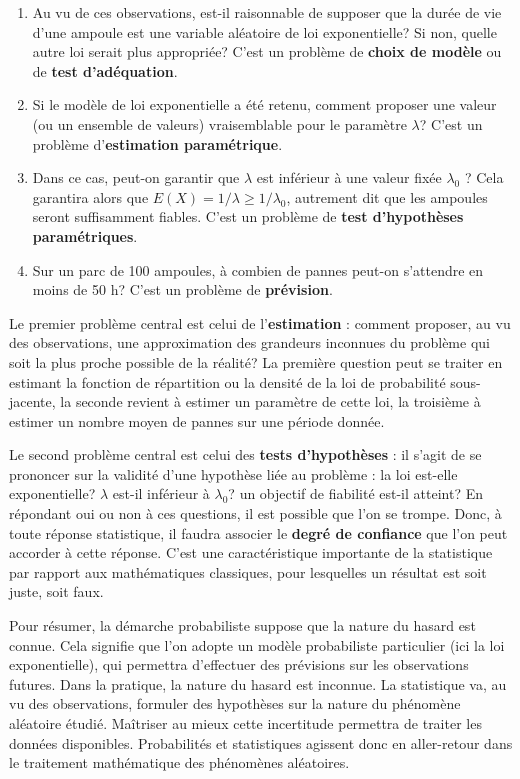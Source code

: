 \documentclass[]{book}
\providecommand{\tightlist}{%
  \setlength{\itemsep}{0pt}\setlength{\parskip}{0pt}}
\theoremstyle{magentacolor}
\theoremstyle{proprie}
\theoremstyle{exstyle}
\theoremstyle{exostyle}
\theoremstyle{definition}
\theoremstyle{definition}
\theoremstyle{definition}
\theoremstyle{remark}
\begin{document}
\begin{enumerate}
\def\labelenumi{\arabic{enumi}.}
\tightlist
\item
  Au vu de ces observations, est-il raisonnable de supposer que la durée de vie d'une
  ampoule est une variable aléatoire de loi exponentielle? Si non, quelle autre loi serait
  plus appropriée? C'est un problème de \textbf{choix de modèle} ou de \textbf{test d'adéquation}.
\item
  Si le modèle de loi exponentielle a été retenu, comment proposer une valeur (ou
  un ensemble de valeurs) vraisemblable pour le paramètre \(\lambda\)? C'est un problème
  d'\textbf{estimation paramétrique}.
\item
  Dans ce cas, peut-on garantir que \(\lambda\) est inférieur à une valeur fixée \(\lambda_0\) ? Cela garantira
  alors que \(E(X) = 1/\lambda \geq 1/\lambda_0\), autrement dit que les ampoules seront suffisamment fiables. C'est un problème de \textbf{test d'hypothèses paramétriques}.
\item
  Sur un parc de 100 ampoules, à combien de pannes peut-on s'attendre en moins de
  50 h? C'est un problème de \textbf{prévision}.
\end{enumerate}

Le premier problème central est celui de l'\textbf{estimation} : comment proposer, au vu des
observations, une approximation des grandeurs inconnues du problème qui soit la plus
proche possible de la réalité? La première question peut se traiter en estimant la fonction
de répartition ou la densité de la loi de probabilité sous-jacente, la seconde revient à
estimer un paramètre de cette loi, la troisième à estimer un nombre moyen de pannes
sur une période donnée.

Le second problème central est celui des \textbf{tests d'hypothèses} : il s'agit de se prononcer sur la validité d'une hypothèse liée au problème : la loi est-elle exponentielle?
\(\lambda\) est-il inférieur à \(\lambda_0\)? un objectif de fiabilité est-il atteint? En répondant oui ou non à ces questions, il est possible que l'on se trompe. Donc, à toute réponse statistique, il
faudra associer le \textbf{degré de confiance} que l'on peut accorder à cette réponse. C'est une
caractéristique importante de la statistique par rapport aux mathématiques classiques,
pour lesquelles un résultat est soit juste, soit faux.

Pour résumer, la démarche probabiliste suppose que la nature du hasard est connue.
Cela signifie que l'on adopte un modèle probabiliste particulier (ici la loi exponentielle),
qui permettra d'effectuer des prévisions sur les observations futures. Dans la pratique, la
nature du hasard est inconnue. La statistique va, au vu des observations, formuler des
hypothèses sur la nature du phénomène aléatoire étudié. Maîtriser au mieux cette incertitude permettra de traiter les données disponibles. Probabilités et statistiques agissent
donc en aller-retour dans le traitement mathématique des phénomènes aléatoires.
\end{document}
